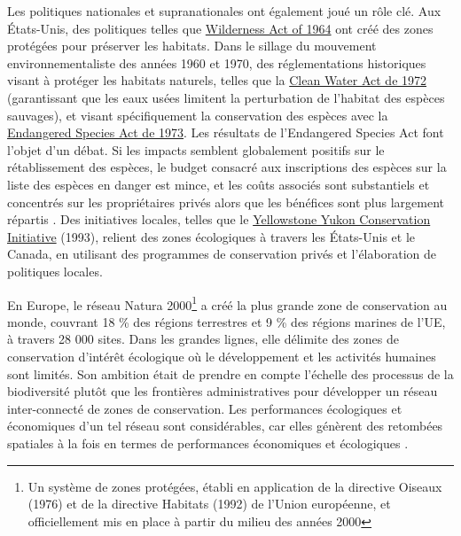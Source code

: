 Les politiques nationales et supranationales ont également joué un rôle clé.  Aux États-Unis, des politiques telles que \href{https://www.fs.usda.gov/Internet/FSE_DOCUMENTS/fseprd645666.pdf}{Wilderness Act of 1964} ont créé des zones protégées pour préserver les habitats. Dans le sillage du mouvement environnementaliste des années 1960 et 1970, des réglementations historiques visant à protéger les habitats naturels, telles que la \href{https://www.epa.gov/laws-regulations/summary-clean-water-act}{Clean Water Act de 1972} (garantissant que les eaux usées limitent la perturbation de l'habitat des espèces sauvages), et visant spécifiquement la conservation des espèces avec la \href{https://www.fws.gov/sites/default/files/documents/endangered-species-act-accessible.pdf}{Endangered Species Act de 1973}. Les résultats de l'Endangered Species Act font l'objet d'un débat. Si les impacts semblent globalement positifs sur le rétablissement des espèces, le budget consacré aux inscriptions des espèces sur la liste des espèces en danger est mince, et les coûts associés sont substantiels et concentrés sur les propriétaires privés alors que les bénéfices sont plus largement répartis \citep{brown_economics_1998, langpap_economics_2018}. Des initiatives locales, telles que le \href{https://y2y.net/}{Yellowstone Yukon Conservation Initiative} (1993), relient des zones écologiques à travers les États-Unis et le Canada, en utilisant des programmes de conservation privés et l'élaboration de politiques locales. 

En Europe, le réseau Natura 2000\footnote{Un système de zones protégées, établi en application de la directive Oiseaux (1976) et de la directive Habitats (1992) de l'Union européenne, et officiellement mis en place à partir du milieu des années 2000} a créé la plus grande zone de conservation au monde, couvrant 18 \% des régions terrestres et 9 \% des régions marines de l'UE, à travers 28 000 sites. Dans les grandes lignes, elle délimite des zones de conservation d'intérêt écologique où le développement et les activités humaines sont limités. Son ambition était de prendre en compte l'échelle des processus de la biodiversité plutôt que les frontières administratives pour développer un réseau inter-connecté de zones de conservation. Les performances écologiques et économiques d'un tel réseau sont considérables, car elles génèrent des retombées spatiales à la fois en termes de performances économiques et écologiques \citep{cocco_relaxing_2023}.

